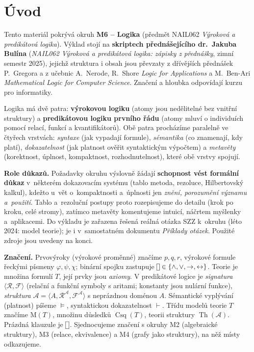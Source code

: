 \documentclass[11pt,a4paper]{article}
\newcommand{\Mset}{\mathrm{M}}              %
\newcommand{\Csq}{\operatorname{Csq}}       %
\newcommand{\Th}{\operatorname{Th}}         %
\newcommand{\eclause}{\mathord{\text{\framebox[1.25ex][c]{\rule{0pt}{0.95ex}}}}}
\newcommand{\conn}{\mathbin{\vcenter{\hbox{\framebox[1.05ex][c]{\rule{0pt}{0.72ex}}}}}}
\begin{document}
\maketitle
\tableofcontents
\bigskip

\section*{Úvod}

Tento materiál pokrývá okruh \textbf{M6 -- Logika} (předmět NAIL062 \emph{Výroková a predikátová logika}). Výklad stojí na \textbf{skriptech přednášejícího dr.~Jakuba Bulína} (\emph{NAIL062 Výroková a predikátová logika: zápisky z přednášky}, zimní semestr 2025), jejichž struktura i obsah jsou převzaty z dřívějších přednášek P.~Gregora a z učebnic A.~Nerode, R.~Shore \emph{Logic for Applications} a M.~Ben-Ari \emph{Mathematical Logic for Computer Science}. Značení a hloubka odpovídají kurzu pro informatiky.

Logika má dvě patra: \textbf{výrokovou logiku} (atomy jsou nedělitelné  bez vnitřní struktury) a \textbf{predikátovou logiku prvního řádu} (atomy mluví o individuích pomocí relací, funkcí a kvantifikátorů). Obě patra procházíme paralelně ve čtyřech vrstvách: \emph{syntaxe} (jak vypadají formule), \emph{sémantika} (co znamenají, kdy platí), \emph{dokazatelnost} (jak platnost ověřit syntaktickým výpočtem) a \emph{metavěty} (korektnost, úplnost, kompaktnost, rozhodnutelnost), které obě vrstvy spojují.

\medskip
\noindent\textbf{Role důkazů.} Požadavky okruhu výslovně žádají \textbf{schopnost vést formální důkaz} v~některém dokazovacím systému (tablo metoda, rezoluce, Hilbertovský kalkul), kdežto u~vět o~kompaktnosti a~úplnosti jen \emph{znění, porozumění významu a~použití}. Tablo a~rezoluční postupy proto rozepisujeme do detailu (krok po kroku, celé stromy), zatímco metavěty komentujeme intuicí, náčrtem myšlenky a~aplikacemi. Do výkladu je zařazena řešená reálná otázka SZZ k~okruhu (léto 2024: model teorie); je i v~samostatném dokumentu \emph{Příklady otázek}. Použité zdroje jsou uvedeny na konci.

\medskip
\noindent\textbf{Značení.} Prvovýroky (výrokové proměnné) značíme $p,q,r$, výrokové formule řeckými písmeny $\varphi,\psi,\chi$; binární spojku zastupuje $\conn\in\{\wedge,\vee,\to,\leftrightarrow\}$. Teorie je množina formulí $T$, její prvky jsou \emph{axiomy}. V predikátové logice je \emph{signatura} $\langle\mathcal R,\mathcal F\rangle$ (relační a funkční symboly s aritami; konstanty jsou nulární funkce), \emph{struktura} $\mathcal A=\langle A,\mathcal R^{\mathcal A},\mathcal F^{\mathcal A}\rangle$ s neprázdnou doménou $A$. Sémantické vyplývání (platnost) píšeme $\models$, syntaktickou dokazatelnost $\vdash$. Třídu modelů teorie $T$ značíme $\Mset(T)$, množinu důsledků $\Csq(T)$, teorii struktury $\Th(\mathcal A)$. Prázdná klauzule je $\eclause$. Sjednocujeme značení s okruhy M2 (algebraické struktury), M3 (relace, ekvivalence) a M4 (grafy jako struktury), na něž místy odkazujeme.
\end{document}
